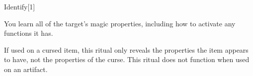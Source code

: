 \begin{spellsection}{Identify}[1]
    \begin{spellheader}
    \end{spellheader}
    \begin{spellcontent}
        \begin{spelltargetinginfo}
        \end{spelltargetinginfo}
        \begin{spelleffects}

            \spelleffect You learn all of the target's magic properties, including how to activate any functions it has.
        \end{spelleffects}
    \end{spellcontent}
    \begin{spellfooter}
        \spellnotes If used on a cursed item, this ritual only reveals the properties the item appears to have, not the properties of the curse. This ritual does not function when used on an artifact.
    \end{spellfooter}
\end{spellsection}

